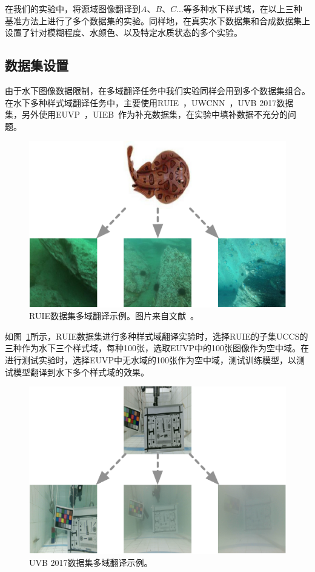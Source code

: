 在我们的实验中，将源域图像翻译到$A$、$B$、$C$...等多种水下样式域，在以上三种基准方法上进行了多个数据集的实验。同样地，在真实水下数据集和合成数据集上设置了针对模糊程度、水颜色、以及特定水质状态的多个实验。

\subsection{数据集设置}
由于水下图像数据限制，在多域翻译任务中我们实验同样会用到多个数据集组合。在水下多种样式域翻译任务中，主要使用RUIE~\cite{liu2019real}，UWCNN~\cite{li2020underwater}，UVB 2017数据集，另外使用EUVP~\cite{islam2020fast}，UIEB~\cite{li2019underwater}作为补充数据集，在实验中填补数据不充分的问题。

\begin{figure}[ht]
    \centering
  \includegraphics[width=\textwidth]{figures/RUIE_dataset_domain.pdf}
  \caption{RUIE数据集多域翻译示例。图片来自文献~\cite{liu2019real,islam2020fast}。}
  \label{fig:ruie_domain}
\end{figure}

如图~\ref{fig:ruie_domain}所示，RUIE数据集进行多种样式域翻译实验时，选择RUIE的子集UCCS的三种作为水下三个样式域，每种100张，选取EUVP中的100张图像作为空中域。在进行测试实验时，选择EUVP中无水域的100张作为空中域，测试训练模型，以测试模型翻译到水下多个样式域的效果。

\begin{figure}[ht]
    \centering
  \includegraphics[width=\textwidth]{figures/UVB_dataset_domain.pdf}
  \caption{UVB 2017数据集多域翻译示例。}
  \label{fig:uvb_domain}
\end{figure}


